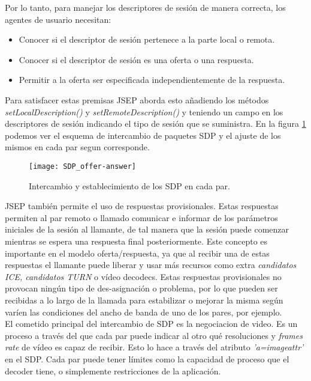 Por lo tanto, para manejar los descriptores de sesión de manera correcta, los agentes de usuario necesitan:

\begin{itemize}
\item Conocer si el descriptor de sesión pertenece a la parte local o remota.
\item Conocer si el descriptor de sesión es una oferta o una respuesta.
\item Permitir a la oferta ser especificada independientemente de la respuesta.
\end{itemize}

Para satisfacer estas premisas JSEP aborda esto añadiendo los métodos \emph{setLocalDescription()} y \emph{setRemoteDescription()} y teniendo un campo en los descriptores de sesión indicando el tipo de sesión que se suministra. En la figura \ref{fig:sdp-oferta-respuesta} podemos ver el esquema de intercambio de paquetes SDP y el ajuste de los mismos en cada par segun corresponde.\\

\begin{figure}[htb]
\centering
\texttt{[image: SDP\_offer-answer]}
\caption{Intercambio y establecimiento de los SDP en cada par.}
\label{fig:sdp-oferta-respuesta}
\end{figure}

JSEP también permite el uso de respuestas provisionales. Estas respuestas permiten al par remoto o llamado comunicar e informar de los parámetros iniciales de la sesión al llamante, de tal manera que la sesión puede comenzar mientras se espera una respuesta final posteriormente. Este concepto es importante en el modelo oferta/respuesta, ya que al recibir una de estas respuestas el llamante puede liberar y usar más recursos como extra \textit{candidatos ICE, candidatos TURN} o vídeo decodecs. Estas respuestas provisionales no provocan ningún tipo de des-asignación o problema, por lo que pueden ser recibidas a lo largo de la llamada para estabilizar o mejorar la misma según varíen las condiciones del ancho de banda de uno de los pares, por ejemplo.\\


El cometido principal del intercambio de SDP es la negociacion de video. Es un proceso a través del que cada par puede indicar al otro qué resoluciones y \textit{frames rate} de vídeo es capaz de recibir. Esto lo hace a través del atributo \textit{'a=imageattr'} en el SDP. Cada par puede tener límites como la capacidad de proceso que el decoder tiene, o simplemente restricciones de la aplicación.\\



